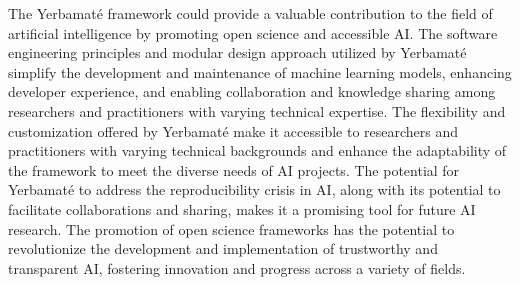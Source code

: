 The Yerbamaté framework could provide a valuable contribution to the field of artificial intelligence by promoting open science and accessible AI. The software engineering principles and modular design approach utilized by Yerbamaté simplify the development and maintenance of machine learning models, enhancing developer experience, and enabling collaboration and knowledge sharing among researchers and practitioners with varying technical expertise. The flexibility and customization offered by Yerbamaté make it accessible to researchers and practitioners with varying technical backgrounds and enhance the adaptability of the framework to meet the diverse needs of AI projects. The potential for Yerbamaté to address the reproducibility crisis in AI, along with its potential to facilitate collaborations and sharing, makes it a promising tool for future AI research. The promotion of open science frameworks has the potential to revolutionize the development and implementation of trustworthy and transparent AI, fostering innovation and progress across a variety of fields.
